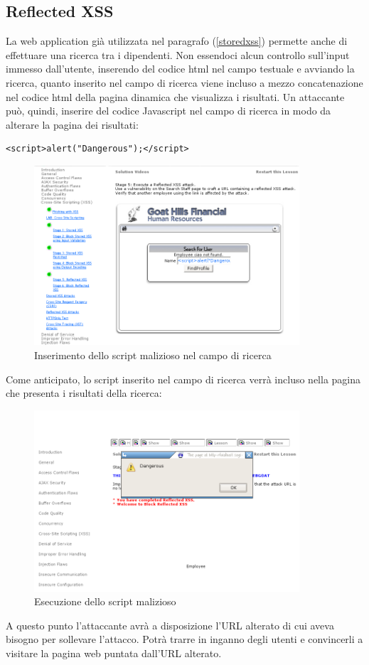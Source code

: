 \documentclass[a4paper,openright,italian]{article}
\begin{document}
\subsection{Reflected XSS}\label{reflectedxss}
La web application gi\`a utilizzata nel paragrafo (\ref{storedxss}) permette anche di effettuare una ricerca tra i dipendenti. Non essendoci alcun controllo sull'input immesso dall'utente, inserendo del codice html nel campo testuale e avviando la ricerca, quanto inserito nel campo di ricerca viene incluso a mezzo concatenazione nel codice html della pagina dinamica che visualizza i risultati. Un attaccante pu\`o, quindi, inserire del codice Javascript nel campo di ricerca in modo da alterare la pagina dei risultati:\newline
\begin{lstlisting}[caption={Script da inserire nel campo di ricerca}, label={code:tick},frame=trBL]
<script>alert("Dangerous");</script>
\end{lstlisting}
\begin{figure}[h]
\centering
\includegraphics[width=280pt]{images/xss_reflected_1.png}
\caption{Inserimento dello script malizioso nel campo di ricerca}
\end{figure}
Come anticipato, lo script inserito nel campo di ricerca verr\`a incluso nella pagina che presenta i risultati della ricerca:
\begin{figure}[h]
\centering
\includegraphics[width=280pt]{images/xss_reflected_2.png}
\caption{Esecuzione dello script malizioso}
\end{figure}
A questo punto l'attaccante avr\`a a disposizione l'URL alterato di cui aveva bisogno per sollevare l'attacco. Potr\`a trarre in inganno degli utenti e convincerli a visitare la pagina web puntata dall'URL alterato.
\clearpage
\end{document}
